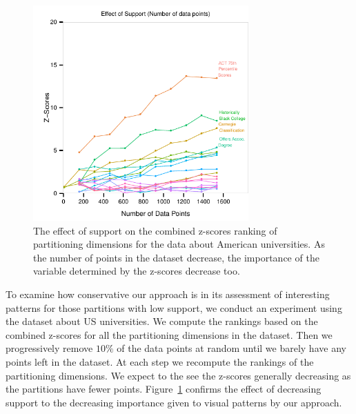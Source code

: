 \begin{figure}
\centering
\includegraphics[width=3.25in,height=3.25in]{images/support-nogrid.pdf}
  \caption{The effect of support on the combined z-scores ranking of partitioning dimensions for the data about American universities. As the number of points in the dataset decrease, the importance of the variable determined by the z-scores decrease too. }
 \label{fig:support}
\end{figure}
To examine how conservative our approach is in its assessment of interesting patterns for those partitions with low support, we conduct an experiment using the dataset about US universities. We compute the rankings based on the combined z-scores for all the partitioning dimensions in the dataset. Then we progressively remove $10\%$ of the data points at random until we barely have any points left in the dataset. At each step we recompute the rankings of the partitioning dimensions. We expect to the see the z-scores generally decreasing as the partitions have fewer points. Figure~\ref{fig:support} confirms the effect of decreasing support to the decreasing importance given to visual patterns by our approach.

